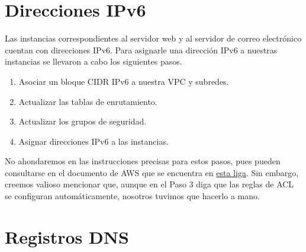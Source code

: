 \documentclass{article}
\begin{document}


\section{Direcciones IPv6}

Las instancias correspondientes al servidor web y al
servidor de correo electr\'onico cuentan con direcciones
IPv6.   Para asignarle una direcci\'on IPv6 a nuestras
instancias se llevaron a cabo los siguientes pasos.
\begin{enumerate}
  \item Asociar un bloque CIDR IPv6 a nuestra VPC y
    subredes.

  \item Actualizar las tablas de enrutamiento.

  \item Actualizar los grupos de seguridad.

  \item Asignar direcciones IPv6 a las instancias.
\end{enumerate}

No ahondaremos en las instrucciones precisas para estos
pasos, pues pueden consultarse en el documento de AWS
que se encuentra en \href{https://docs.aws.amazon.com/vpc/latest/userguide/vpc-migrate-ipv6.html}{esta liga}.  Sin embargo,
creemos valioso mencionar que, aunque en el Paso 3 diga
que las reglas de ACL se configuran autom\'aticamente,
nosotros tuvimos que hacerlo a mano.



\section{Registros DNS}
\label{sec:dns}
\end{document}
